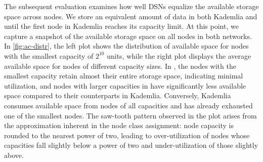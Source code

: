 The subsequent evaluation examines how well DSNs equalize the available storage space across nodes.
We store an equivalent amount of data in both Kademlia and \dht until the first node in Kademlia reaches its capacity limit.
At this point, we capture a snapshot of the available storage space on all nodes in both networks.
In \autoref{fig:ac-distr}, the left plot shows the distribution of available space for nodes with the smallest capacity of $2^{10}$ units, while the right plot displays the average available space for nodes of different capacity sizes.
In \dht, the nodes with the smallest capacity retain almost their entire storage space, indicating minimal utilization, and nodes with larger capacities in \dht have significantly less available space compared to their counterparts in Kademlia.
Conversely, Kademlia consumes available space from nodes of all capacities and has already exhausted one of the smallest nodes.
The saw-tooth pattern observed in the \dht plot arises from the approximation inherent in the node class assignment: node capacity is rounded to the nearest power of two, leading to over-utilization of nodes whose capacities fall slightly below a power of two and under-utilization of those slightly above.
